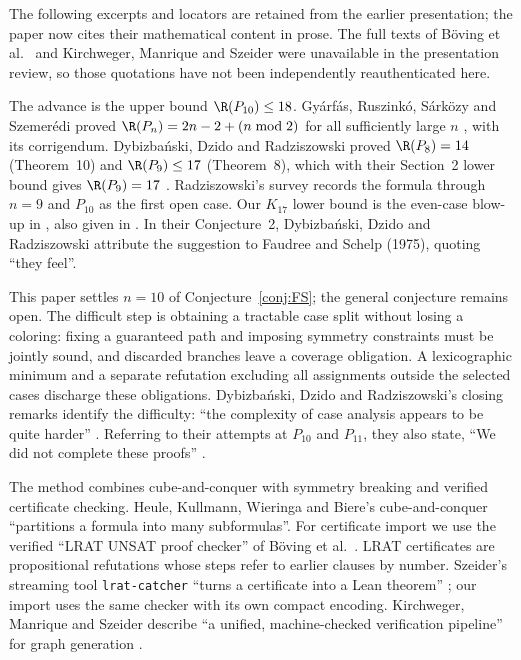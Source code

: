 The following excerpts and locators are retained from the earlier presentation; the paper now cites their mathematical content in prose. The full texts of Böving et al.\ \cite{BBC+25} and Kirchweger, Manrique and Szeider \cite{KMS26} were unavailable in the presentation review, so those quotations have not been independently reauthenticated here.

The advance is the upper bound $\R(P_{10})\le18$.
Gyárfás, Ruszinkó, Sárközy and Szemerédi proved
$\R(P_n)=2n-2+(n\bmod2)$ for all sufficiently large $n$
\cite[Theorem~1]{GRSS07}, with its corrigendum.
Dybizbański, Dzido and Radziszowski proved $\R(P_8)=14$
(Theorem~10) and $\R(P_9)\le17$ (Theorem~8), which with their Section~2
lower bound gives $\R(P_9)=17$ \cite{DDR16}.
Radziszowski's survey \cite[Section~6.4, p.~65]{Rad26}
records the formula through $n=9$ and $P_{10}$ as the first open case.
Our $K_{17}$ lower bound is the even-case blow-up in
\cite[Section~1.1, after Theorem~1]{GRSS07}, also given in
\cite[Section~2]{DDR16}.
In their Conjecture~2, Dybizbański, Dzido and Radziszowski attribute
the suggestion to Faudree and Schelp (1975), quoting ``they feel''.

This paper settles $n=10$ of Conjecture~\ref{conj:FS}; the general
conjecture remains open. The difficult step is obtaining a tractable case
split without losing a coloring: fixing a guaranteed path and imposing
symmetry constraints must be jointly sound, and discarded branches leave
a coverage obligation. A lexicographic minimum and a separate refutation
excluding all assignments outside the selected cases discharge these
obligations. Dybizbański, Dzido and
Radziszowski's closing remarks identify the difficulty:
``the complexity of case analysis appears to be quite harder''
\cite[Section~5]{DDR16}. Referring to their attempts at $P_{10}$ and
$P_{11}$, they also state, ``We did not complete these proofs''
\cite[Section~5]{DDR16}.

The method combines cube-and-conquer with symmetry breaking and verified
certificate checking. Heule, Kullmann, Wieringa and Biere's
cube-and-conquer \cite[Section~3]{HKWB12} ``partitions a formula into many
subformulas''. For certificate import we use the verified ``LRAT UNSAT
proof checker'' of Böving et al.\ \cite[introduction and Section~4.4]{BBC+25}.
LRAT certificates are propositional refutations whose steps refer to
earlier clauses by number.
Szeider's streaming tool \texttt{lrat-catcher} ``turns a certificate into a
Lean theorem'' \cite[abstract]{Sze26}; our import uses the same checker
with its own compact encoding. Kirchweger, Manrique and Szeider describe
``a unified, machine-checked verification pipeline'' for graph generation
\cite[abstract]{KMS26}.

